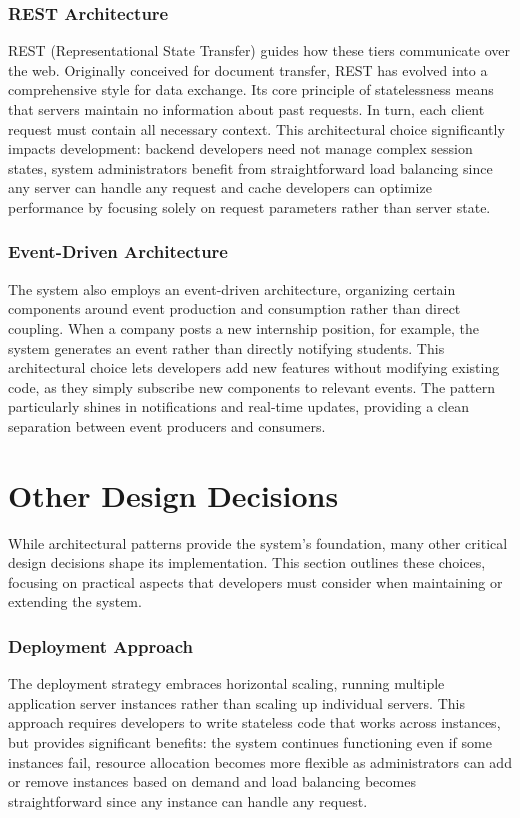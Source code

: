 \subsubsection{REST Architecture}
REST (Representational State Transfer) guides how these tiers communicate over the web.
Originally conceived for document transfer, REST has evolved into a comprehensive style for data exchange.
Its core principle of statelessness means that servers maintain no information about past requests.
In turn, each client request must contain all necessary context.
This architectural choice significantly impacts development: backend developers need not manage complex session states, system administrators benefit from straightforward load balancing since any server can handle any request and cache developers can optimize performance by focusing solely on request parameters rather than server state.

\subsubsection{Event-Driven Architecture}
The system also employs an event-driven architecture, organizing certain components around event production and consumption rather than direct coupling.
When a company posts a new internship position, for example, the system generates an event rather than directly notifying students.
This architectural choice lets developers add new features without modifying existing code, as they simply subscribe new components to relevant events.
The pattern particularly shines in notifications and real-time updates, providing a clean separation between event producers and consumers.

\section{Other Design Decisions}
While architectural patterns provide the system's foundation, many other critical design decisions shape its implementation.
This section outlines these choices, focusing on practical aspects that developers must consider when maintaining or extending the system.

\subsubsection{Deployment Approach}
The deployment strategy embraces horizontal scaling, running multiple application server instances rather than scaling up individual servers.
This approach requires developers to write stateless code that works across instances, but provides significant benefits: the system continues functioning even if some instances fail, resource allocation becomes more flexible as administrators can add or remove instances based on demand and load balancing becomes straightforward since any instance can handle any request.

